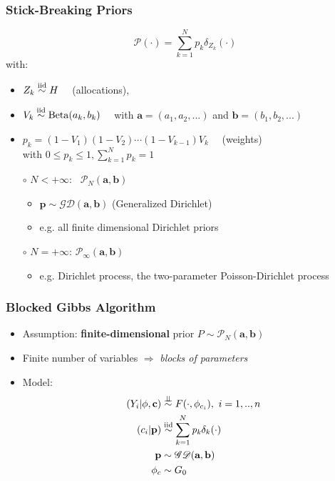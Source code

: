 	

\begin{frame}
	\frametitle{Stick-Breaking Priors}
	$$\mathscr{P}(\cdot)= \sum\limits_{k=1}^N
	\mathit{p_{k}}\delta_{Z_{k}}(\cdot)$$
	with:
	\begin{itemize}
		\item $Z_k \stackrel{\text{iid}}{\sim} H \quad$ (allocations),
		\item $V_k  \stackrel{\text{iid}}{\sim} \operatorname{Beta}(a_{k},b_{k}) \quad$ with $\mathbf{a}=(a_{1},a_{2},...)$ and $\mathbf{b}=(b_{1},b_{2},...)$
		\item $p_k = (1-V_{1}) (1-V_{2}) \cdots (1-V_{k-1}) V_k \quad$ (weights) \\[8pt] %
		with $0 \leq p_k \leq 1, \sum_{k=1}^N p_k = 1$
	\end{itemize}

   	\begin{itemize}
   	    \item[$\circ$] $N<+\infty$: \ $\mathscr{P}_{N}(\textbf{a},\textbf{b})$
   	    \begin{itemize}
   	        \item $\mathbf{p} \sim \mathscr{GD}(\textbf{a},\textbf{b})$ (Generalized Dirichlet)
   	        \item e.g. all finite dimensional Dirichlet priors
   	    \end{itemize}
   	    \item[$\circ$] $N=+\infty$: $\mathscr{P}_{\infty}(\textbf{a},\textbf{b})$
   	    \begin{itemize}
   	        \item e.g. Dirichlet process, the two-parameter Poisson-Dirichlet process
   	    \end{itemize}
   	\end{itemize}
\end{frame}


\begin{frame}
	\frametitle{Blocked Gibbs Algorithm}
	\begin{itemize}
	    \item Assumption: \textbf{finite-dimensional} prior $P \sim  \mathscr{P}_{N}(\textbf{a},\textbf{b})$
        \item Finite number of variables $\Rightarrow$ \textit{blocks of parameters}
        \item Model:
        \begin{align*}
            (Y_{i}|\mathbf{\phi},\mathbf{c})&\indsim F(\cdot,\phi_{c_{i}}) , \ i=1,..,n \\
            (c_{i}|\mathbf{p})&\iidsim\sum\limits_{k=1}^N \mathit{p_{k}}\delta_{k}(\cdot)\\
            \mathbf{p} &\sim \mathscr{GD}(\textbf{a},\textbf{b}) \\
            \mathbf{\phi}_{c} & \sim G_{0}
        \end{align*}



	\end{itemize}
\end{frame}




